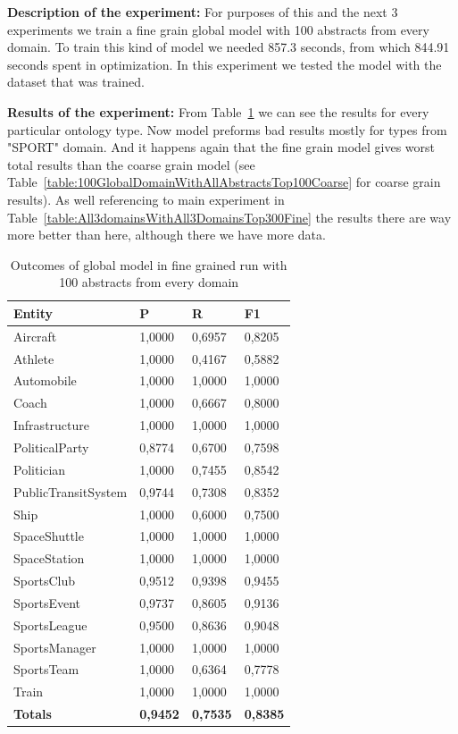 \documentclass[thesis=M,english]{FITthesis}[2018/05/30]
\begin{document}

	\textbf{Description of the experiment:} For purposes of this and the next 3 experiments we train a fine grain global model with 100 abstracts from every domain. To train this kind of model we needed 857.3 seconds, from which 844.91 seconds spent in optimization. In this experiment we tested the model with the dataset that was trained. 

	\textbf{Results of the experiment:} From Table~\ref{table:100GlobalDomainWithAllAbstractsTop100Fine} we can see the results for every particular ontology type. Now model preforms bad results mostly for types from "SPORT" domain. And it happens again that the fine grain model gives worst total results than the coarse grain model (see Table~\ref{table:100GlobalDomainWithAllAbstractsTop100Coarse} for coarse grain results). As well referencing to main experiment in Table~\ref{table:All3domainsWithAll3DomainsTop300Fine} the results there are way more better than here, although there we have more data.

	\begin{table}[H]\centering
		\begin{tabular}{|l|l|l|l|}
			\hline {\textbf{Entity}} & {\textbf{P}} & {\textbf{R}} & {\textbf{F1}}\\\hline
				Aircraft & 1,0000 & 0,6957 & 0,8205\\
				Athlete & 1,0000 & 0,4167 & 0,5882\\
				Automobile & 1,0000 & 1,0000 & 1,0000\\ 
				Coach & 1,0000 & 0,6667 & 0,8000\\
				Infrastructure & 1,0000 & 1,0000 & 1,0000\\
				PoliticalParty & 0,8774 & 0,6700 & 0,7598\\
				Politician & 1,0000 & 0,7455 & 0,8542\\
				PublicTransitSystem & 0,9744 & 0,7308 & 0,8352\\
				Ship & 1,0000 & 0,6000 & 0,7500\\
				SpaceShuttle & 1,0000 & 1,0000 & 1,0000\\
				SpaceStation & 1,0000 & 1,0000 & 1,0000\\ 
				SportsClub & 0,9512 & 0,9398 & 0,9455\\
				SportsEvent & 0,9737 & 0,8605 & 0,9136\\
				SportsLeague & 0,9500 & 0,8636 & 0,9048\\
				SportsManager & 1,0000 & 1,0000 & 1,0000\\
				SportsTeam & 1,0000 & 0,6364 & 0,7778\\
				Train & 1,0000 & 1,0000 & 1,0000\\\hline
				\textbf{Totals} & \textbf{0,9452} & \textbf{0,7535} & \textbf{0,8385}\\\hline
		\end{tabular}
		\caption{Outcomes of global model in fine grained run with 100 abstracts from every domain \label{table:100GlobalDomainWithAllAbstractsTop100Fine}}
	\end{table}
\end{document}
